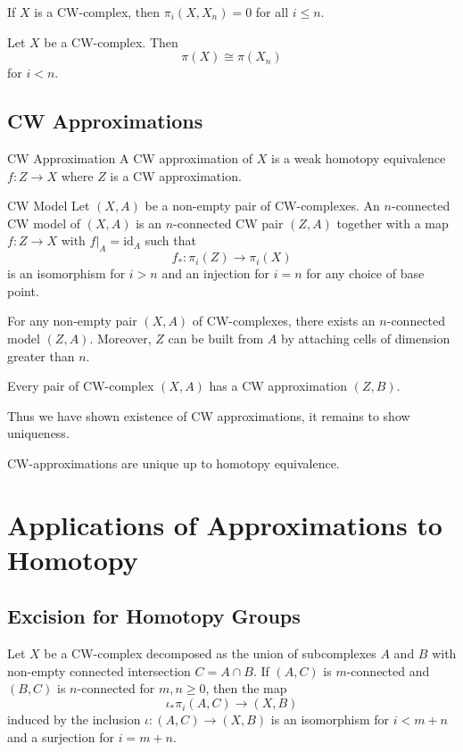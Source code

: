 \documentclass[a4paper]{article}
\begin{document}
\begin{crl}{}{} If $X$ is a CW-complex, then $\pi_i(X,X_n)=0$ for all $i\leq n$. 
\end{crl}

\begin{crl}{}{} Let $X$ be a CW-complex. Then $$\pi(X)\cong\pi(X_n)$$ for $i<n$. 
\end{crl}

\subsection{CW Approximations}
\begin{defn}{CW Approximation}{} A CW approximation of $X$ is a weak homotopy equivalence $f:Z\to X$ where $Z$ is a CW approximation. 
\end{defn}


\begin{defn}{CW Model}{} Let $(X,A)$ be a non-empty pair of CW-complexes. An $n$-connected CW model of $(X,A)$ is an $n$-connected CW pair $(Z,A)$ together with a map $f:Z\to X$ with $f|_A=\text{id}_A$ such that $$f_\ast:\pi_i(Z)\to\pi_i(X)$$ is an isomorphism for $i>n$ and an injection for $i=n$ for any choice of base point. 
\end{defn}

\begin{thm}{}{} For any non-empty pair $(X,A)$ of CW-complexes, there exists an $n$-connected model $(Z,A)$. Moreover, $Z$ can be built from $A$ by attaching cells of dimension greater than $n$. 
\end{thm}

\begin{crl}{}{} Every pair of CW-complex $(X,A)$ has a CW approximation $(Z,B)$. 
\end{crl}

Thus we have shown existence of CW approximations, it remains to show uniqueness. 

\begin{crl}{}{} CW-approximations are unique up to homotopy equivalence. 
\end{crl}

\pagebreak

\section{Applications of Approximations to Homotopy}
\subsection{Excision for Homotopy Groups}
\begin{thm}{}{} Let $X$ be a CW-complex decomposed as the union of subcomplexes $A$ and $B$ with non-empty connected intersection $C=A\cap B$. If $(A,C)$ is $m$-connected and $(B,C)$ is $n$-connected for $m,n\geq 0$, then the map $$\iota_\ast\pi_i(A,C)\to(X,B)$$ induced by the inclusion $\iota:(A,C)\to(X,B)$ is an isomorphism for $i<m+n$ and a surjection for $i=m+n$. 
\end{thm}
\end{document}
